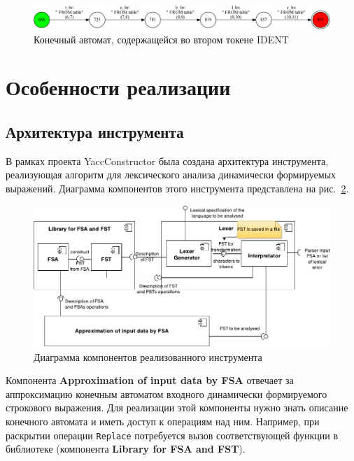\begin{figure}[H]
\begin{center}
\includegraphics[width=1.0\textwidth]{Polubelova/tsql_ident_2}
\caption{Конечный автомат, содержащейся во втором токене IDENT}
\label{fig:tsql_ident_2} 
\end{center}
\end{figure}

\section{Особенности реализации}

\subsection{Архитектура инструмента}

В рамках проекта YaccConstructor была создана архитектура инструмента, реализующая алгоритм для лексического анализа динамически формируемых выражений. Диаграмма компонентов этого инструмента представлена на рис.~\ref{fig:CompDiag}.

\begin{figure}[H]
\begin{center}
\includegraphics[width=1.0\textwidth]{Polubelova/ComponentDiagram}
\caption{Диаграмма компонентов реализованного инструмента}
\label{fig:CompDiag} 
\end{center}
\end{figure}

Компонента \textbf{Approximation of input data by FSA} отвечает за аппроксимацию конечным автоматом входного динамически формируемого строкового выражения. Для реализации этой компоненты нужно знать описание конечного автомата и иметь доступ к операциям над ним. Например, при раскрытии операции \verb|Replace| потребуется вызов соответствующей функции в библиотеке (компонента \textbf{Library for FSA and FST}). 

